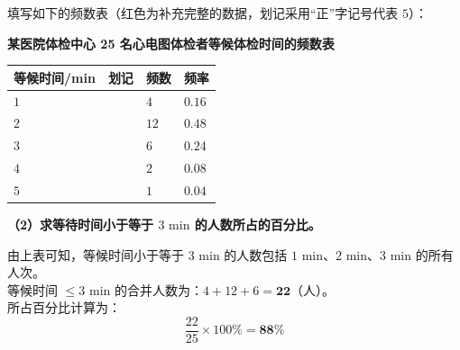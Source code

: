 填写如下的频数表（红色为补充完整的数据，划记采用“正”字记号代表 $5$）：

\vspace{0.2cm}
\begin{center}
\textbf{某医院体检中心 25 名心电图体检者等候体检时间的频数表} \\
\vspace{0.2cm}
\renewcommand{\arraystretch}{1.5}
\begin{tabular}{|>{\centering\arraybackslash}p{3cm}|>{\centering\arraybackslash}p{3.5cm}|>{\centering\arraybackslash}p{2.5cm}|>{\centering\arraybackslash}p{2.5cm}|}
  \hline
  \cellcolor{gray!15} 等候时间/min & \cellcolor{gray!15} 划记 & \cellcolor{gray!15} 频数 & \cellcolor{gray!15} 频率 \\
  \hline
  $1$ & \textbf{\textcolor{red!70!black}{\zhengIV{}}} & \textbf{\textcolor{red!70!black}{$4$}} & \textbf{\textcolor{red!70!black}{$0.16$}} \\
  \hline
  $2$ & \textbf{\textcolor{red!70!black}{\zhengV{} \quad \zhengV{} \quad \zhengII{}}} & \textbf{\textcolor{red!70!black}{$12$}} & \textbf{\textcolor{red!70!black}{$0.48$}} \\
  \hline
  $3$ & \textbf{\textcolor{red!70!black}{\zhengV{} \quad \zhengI{}}} & \textbf{\textcolor{red!70!black}{$6$}} & \textbf{\textcolor{red!70!black}{$0.24$}} \\
  \hline
  $4$ & \textbf{\textcolor{red!70!black}{\zhengII{}}} & \textbf{\textcolor{red!70!black}{$2$}} & \textbf{\textcolor{red!70!black}{$0.08$}} \\
  \hline
  $5$ & \textbf{\textcolor{red!70!black}{\zhengI{}}} & \textbf{\textcolor{red!70!black}{$1$}} & \textbf{\textcolor{red!70!black}{$0.04$}} \\
  \hline
\end{tabular}
\end{center}

\vspace{0.6cm}

\textbf{（2）求等待时间小于等于 $3\text{ min}$ 的人数所占的百分比。}

\vspace{0.2cm}

由上表可知，等候时间小于等于 $3\text{ min}$ 的人数包括 $1\text{ min}$、$2\text{ min}$、$3\text{ min}$ 的所有人次。\\
等候时间 $\leqslant 3\text{ min}$ 的合并人数为：$4 + 12 + 6 = \boldsymbol{22}$（人）。\\
所占百分比计算为：
$$ \frac{22}{25} \times 100\% = \boldsymbol{88\%} $$

